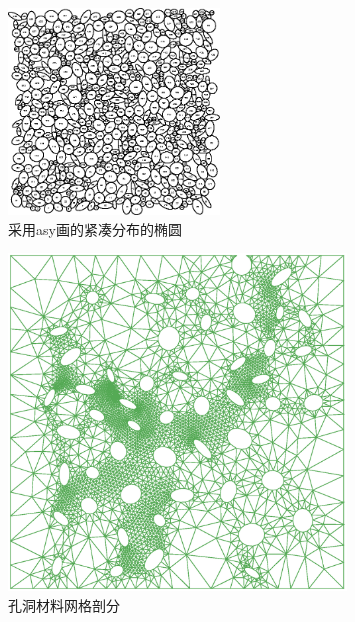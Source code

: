 \begin{figure}[htbp]
	\begin{center}
		\includegraphics[width=0.5\textwidth]{pics/norm_destribution_1_asy.eps}
	\end{center}
	\caption{采用asy画的紧凑分布的椭圆}
	\label{fig:asynormal}
\end{figure}
\begin{figure}[htbp]
	\begin{center}
		\includegraphics[width=0.8\textwidth]{pics/fem_ellipse_hole_mesh.eps}
	\end{center}
	\caption{孔洞材料网格剖分}
	\label{fig_ellipsemesh_hole}
\end{figure}
